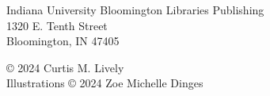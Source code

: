 \null\vfill
\begin{flushleft}
\thispagestyle{empty}
Indiana University Bloomington Libraries Publishing\\
1320 E. Tenth Street\\
Bloomington, IN 47405
\vspace{5mm}

© 2024 Curtis M. Lively\\
Illustrations © 2024 Zoe Michelle Dinges

\vspace{4mm}


\vspace{3mm}



\vspace{3mm}



\end{flushleft}
